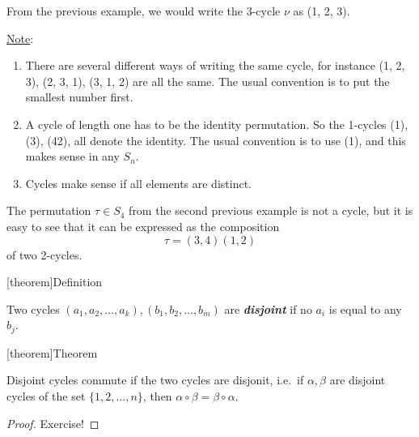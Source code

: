 \documentclass[12pt]{report}
\theoremstyle{definition}
\begin{document}
\begin{ex}
    From the previous example, we would write the 3-cycle $\nu$ as (1, 2, 3).
\end{ex}

\noindent\underline{Note}:
\begin{enumerate}[label = (\arabic*)]
    \item There are several different ways of writing the same cycle, for instance
        (1, 2, 3), (2, 3, 1), (3, 1, 2) are all the same. The usual convention is to
        put the smallest number first.

    \item A cycle of length one has to be the identity permutation.
        So the 1-cycles (1), (3), (42), all denote the identity. 
        The usual convention is to use (1), and this makes sense in any $S_n$.

    \item Cycles make sense if all elements are distinct.
\end{enumerate}

\begin{ex}
    The permutation $\tau \in{}S_4$ from the second previous example is not a cycle,
    but it is easy to see that it can be expressed as the composition\[
        \tau = (3,4)(1,2)
    \]of two 2-cycles.
\end{ex}

[theorem]{Definition}
\begin{disjoint cycles}
    Two cycles $(a_1, a_2, \ldots, a_k), (b_1, b_2, \ldots, b_m)$ are \textbf{\emph{disjoint}}
    if no $a_i$ is equal to any $b_j$.
\end{disjoint cycles}

[theorem]{Theorem}
\begin{disjoint cycles commute}
    Disjoint cycles commute if the two cycles are disjonit, i.e.\
    if $\alpha, \beta$ are disjoint cycles of the set $\{1, 2, \ldots, n\}$,
    then $\alpha \circ \beta = \beta \circ \alpha$.
\end{disjoint cycles commute}

\begin{proof}
    Exercise!
\end{proof}
\end{document}
